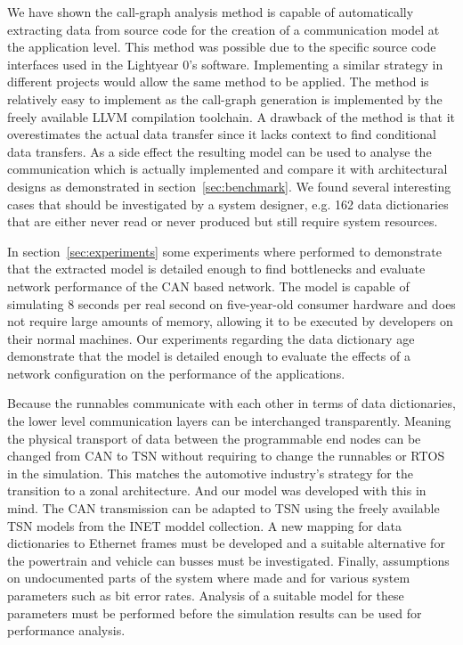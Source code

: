 We have shown the call-graph analysis method is capable of automatically extracting data from source code for the creation of a communication model at the application level. This method was possible due to the specific source code interfaces used in the Lightyear 0's software. Implementing a similar strategy in different projects would allow the same method to be applied. The method is relatively easy to implement as the call-graph generation is implemented by the freely available LLVM compilation toolchain. A drawback of the method is that it overestimates the actual data transfer since it lacks context to find conditional data transfers. As a side effect the resulting model can be used to analyse the communication which is actually implemented and compare it with architectural designs as demonstrated in section~\ref{sec:benchmark}. We found several interesting cases that should be investigated by a system designer, e.g. 162 data dictionaries that are either never read or never produced but still require system resources. 

In section~\ref{sec:experiments} some experiments where performed to demonstrate that the extracted model is detailed enough to find bottlenecks and evaluate network performance of the CAN based network. The model is capable of simulating 8 seconds per real second on five-year-old consumer hardware and does not require large amounts of memory, allowing it to be executed by developers on their normal machines. Our experiments regarding the data dictionary age demonstrate that the model is detailed enough to evaluate the effects of a network configuration on the performance of the applications.

Because the runnables communicate with each other in terms of data dictionaries, the lower level communication layers can be interchanged transparently. Meaning the physical transport of data between the programmable end nodes can be changed from CAN to TSN without requiring to change the runnables or RTOS in the simulation. This matches the automotive industry's strategy for the transition to a zonal architecture. And our model was developed with this in mind. The CAN transmission can be adapted to TSN using the freely available TSN models from the INET moddel collection. A new mapping for data dictionaries to Ethernet frames must be developed and a suitable alternative for the powertrain and vehicle can busses must be investigated. Finally, assumptions on undocumented parts of the system where made and for various system parameters such as bit error rates. Analysis of a suitable model for these parameters must be performed before the simulation results can be used for performance analysis. 